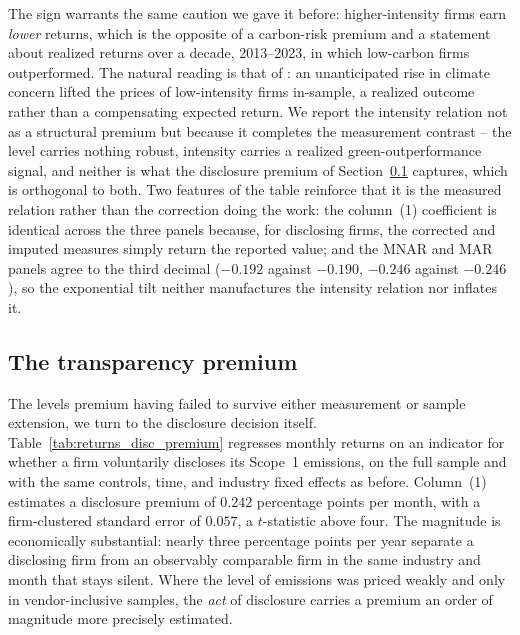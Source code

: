 \documentclass[a4paper,12pt]{article}
\newcommand{\citet}[1]{\textcite{#1}}
\begin{document}
The sign warrants the same caution we gave it before: higher-intensity firms earn \emph{lower} returns, which is the opposite of a carbon-risk premium and a statement about realized returns over a decade, 2013--2023, in which low-carbon firms outperformed. The natural reading is that of \citet{pastor2025green}: an unanticipated rise in climate concern lifted the prices of low-intensity firms in-sample, a realized outcome rather than a compensating expected return. We report the intensity relation not as a structural premium but because it completes the measurement contrast -- the level carries nothing robust, intensity carries a realized green-outperformance signal, and neither is what the disclosure premium of Section~\ref{subsec:premium} captures, which is orthogonal to both. Two features of the table reinforce that it is the measured relation rather than the correction doing the work: the column~(1) coefficient is identical across the three panels because, for disclosing firms, the corrected and imputed measures simply return the reported value; and the MNAR and MAR panels agree to the third decimal ($-0.192$ against $-0.190$, $-0.246$ against $-0.246$), so the exponential tilt neither manufactures the intensity relation nor inflates it.

\subsection{The transparency premium}
\label{subsec:premium}

The levels premium having failed to survive either measurement or sample extension,
we turn to the disclosure decision itself. Table~\ref{tab:returns_disc_premium}
regresses monthly returns on an indicator for whether a firm voluntarily discloses its Scope~1 emissions, on the full sample and with the same controls, time,
and industry fixed effects as before. Column~(1) estimates a disclosure premium of $0.242$ percentage points per month, with a firm-clustered standard error of $0.057$, a $t$-statistic above four. The magnitude is economically substantial: nearly three
percentage points per year separate a disclosing firm from an observably comparable firm in the same industry and month that stays silent. Where the level of emissions was priced weakly and only in vendor-inclusive samples, the \emph{act} of disclosure
carries a premium an order of magnitude more precisely estimated.
\end{document}
